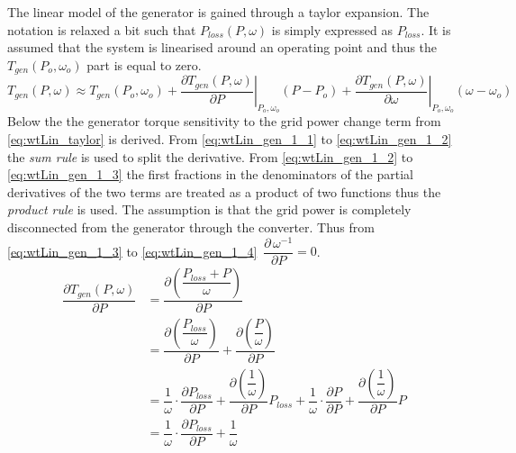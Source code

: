 The linear model of the generator is gained through a taylor expansion. The notation is relaxed a bit such that $ P_{loss}( P, \omega) $ is simply expressed as $ P_{loss} $. It is assumed that the system is linearised around an operating point and thus the $ T_{gen}(P_o, \omega_o) $ part is equal to zero.
\begin{equation}\label{eq:wtLin_taylor}
	T_{gen}( P, \omega) \approx T_{gen}(P_o, \omega_o) + 
	\left. \dfrac{\partial T_{gen}( P, \omega)}{\partial P} \right |_{P_o,\omega_o} ( P-P_o) + 
	\left. \dfrac{\partial T_{gen}( P, \omega)}{\partial \omega} \right |_{P_o,\omega_o} (\omega - \omega_o)
\end{equation}
Below the the generator torque sensitivity to the grid power change term from \cref{eq:wtLin_taylor} is derived. From \cref{eq:wtLin_gen_1_1} to \cref{eq:wtLin_gen_1_2} the \textit{sum rule} is used to split the derivative. From \cref{eq:wtLin_gen_1_2} to \cref{eq:wtLin_gen_1_3} the first fractions in the denominators of the partial derivatives of the two terms are treated as a product of two functions thus the \textit{product rule} is used. The assumption is that the grid power is completely disconnected from the generator through the converter. Thus from \cref{eq:wtLin_gen_1_3} to \cref{eq:wtLin_gen_1_4} $ \, \dfrac{\partial \, \omega^{-1}}{\partial P} = 0 $.
\begin{align} 
	\dfrac{\partial T_{gen}( P, \omega)}{\partial P} &= \dfrac{\partial \left (\dfrac{P_{loss} +  P}{\omega}\right )}{\partial P} \label{eq:wtLin_gen_1_1} \\
	& = \dfrac{\partial \left (\dfrac{P_{loss}}{\omega} \right )}{\partial P} + \dfrac{\partial \left ( \dfrac{ P}{\omega} \right )}{\partial P} \label{eq:wtLin_gen_1_2} \\
	& = \dfrac{1}{\omega} \cdot \dfrac{\partial P_{loss}}{\partial P} + \dfrac{\partial \left ( \dfrac{1}{\omega} \right )}{\partial P} P_{loss} + \dfrac{1}{\omega} \cdot \dfrac{\partial P}{\partial P} + \dfrac{\partial \left (\dfrac{1}{\omega} \right )}{\partial P}  P \label{eq:wtLin_gen_1_3} \\
	& = \dfrac{1}{\omega} \cdot \dfrac{\partial P_{loss}}{\partial P} + \dfrac{1}{\omega} \label{eq:wtLin_gen_1_4}
\end{align}


